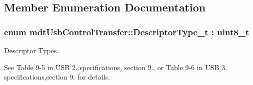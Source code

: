 \subsection{Member Enumeration Documentation}
\hypertarget{classmdt_usb_control_transfer_a80b0f5ac6d8ae7b7e7471b012c34937d}{
\subsubsection[{Descriptor\-Type\-\_\-t}]{\setlength{\rightskip}{0pt plus 5cm}enum {\bf mdt\-Usb\-Control\-Transfer\-::\-Descriptor\-Type\-\_\-t} \-: uint8\-\_\-t\hspace{0.3cm}{\ttfamily [strong]}}}\label{classmdt_usb_control_transfer_a80b0f5ac6d8ae7b7e7471b012c34937d}


Descriptor Types. 

See Table 9-\/5 in U\-S\-B 2. specifications, section 9., or Table 9-\/6 in U\-S\-B 3. specifications,section 9. for details.

